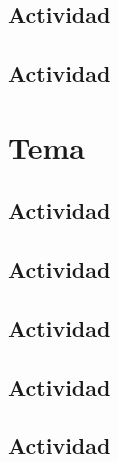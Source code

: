 \documentclass[10pt,examen]{repaso_layout}
\begin{document}
\begin{questions}
    \subsection{Actividad}
    \subsection{Actividad}
        \section{Tema}
    \subsection{Actividad}
    \subsection{Actividad}
    \subsection{Actividad}
    \subsection{Actividad}
    \subsection{Actividad}
\end{questions}
\end{document}
